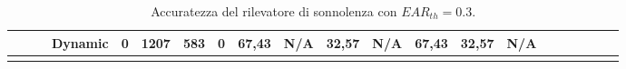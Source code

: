 \documentclass[12pt]{article}
\begin{document}
\begin{landscape}
\begin{table}[]
\begin{adjustbox}{width=1.4\textwidth}
\begin{tabular}{lllllllllllllllccllll}
				\multicolumn{1}{|l|}{} & \multicolumn{1}{l|}{} & \multicolumn{1}{l|}{} & \multicolumn{1}{l|}{Dynamic} & \multicolumn{1}{l|}{0} & \multicolumn{1}{l|}{1207} & \multicolumn{1}{l|}{583} & \multicolumn{1}{l|}{0} & \multicolumn{1}{l|}{67,43} & \multicolumn{1}{l|}{N/A} & \multicolumn{1}{l|}{32,57} & \multicolumn{1}{l|}{N/A} & \multicolumn{1}{l|}{67,43} & \multicolumn{1}{l|}{32,57} & \multicolumn{1}{l|}{N/A} & \multicolumn{1}{c|}{} & \multicolumn{1}{c|}{} & \multicolumn{1}{l|}{} & \multicolumn{1}{l|}{} & \multicolumn{1}{l|}{} & \multicolumn{1}{l|}{} \\ \hline
				& & & & & & & & & & & & & & & \multicolumn{1}{l}{} & \multicolumn{1}{l}{} & & & &
			\end{tabular}
		\end{adjustbox}
		\caption{Accuratezza del rilevatore di sonnolenza con $EAR_{th}=0.3$.}
		\label{table:global_ear_30}
	\end{table}
\end{landscape}
\end{document}
